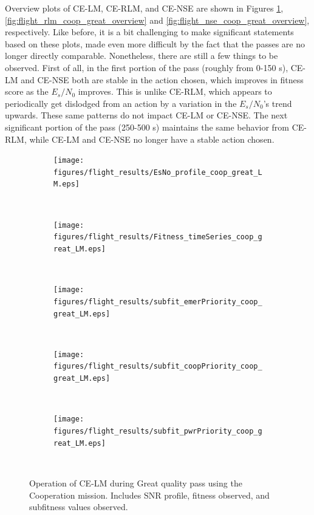 \par Overview plots of CE-LM, CE-RLM, and CE-NSE are shown in Figures \ref{fig:flight_lm_coop_great_overview},\ref{fig:flight_rlm_coop_great_overview} and \ref{fig:flight_nse_coop_great_overview}, respectively. Like before, it is a bit challenging to make significant statements based on these plots, made even more difficult by the fact that the passes are no longer directly comparable. Nonetheless, there are still a few things to be observed. First of all, in the first portion of the pass (roughly from 0-150 s), CE-LM and CE-NSE both are stable in the action chosen, which improves in fitness score as the $E_s/N_0$ improves. This is unlike CE-RLM, which appears to periodically get dislodged from an action by a variation in the $E_s/N_0$'s trend upwards. These same patterns do not impact CE-LM or CE-NSE. The next significant portion of the pass (250-500 s) maintains the same behavior from CE-RLM, while CE-LM and CE-NSE no longer have a stable action chosen. 


\begin{figure}[ht!]
\centering
\begin{subfigure}{\linewidth}
	\centering
	\texttt{[image: figures/flight\_results/EsNo\_profile\_coop\_great\_LM.eps]}
\end{subfigure}\\
\begin{subfigure}{\linewidth}
	\centering
	\texttt{[image: figures/flight\_results/Fitness\_timeSeries\_coop\_great\_LM.eps]}
\end{subfigure}\\
\begin{subfigure}{\linewidth}
	\centering
	\texttt{[image: figures/flight\_results/subfit\_emerPriority\_coop\_great\_LM.eps]}
\end{subfigure}\\
\begin{subfigure}{\linewidth}
	\centering
	\texttt{[image: figures/flight\_results/subfit\_coopPriority\_coop\_great\_LM.eps]}
	
\end{subfigure}\\
\begin{subfigure}{\linewidth}
	\centering
	\texttt{[image: figures/flight\_results/subfit\_pwrPriority\_coop\_great\_LM.eps]}
\end{subfigure}\\
\caption{Operation of CE-LM during Great quality pass using the Cooperation mission. Includes SNR profile, fitness observed, and subfitness values observed.}\label{fig:flight_lm_coop_great_overview}
\end{figure}

